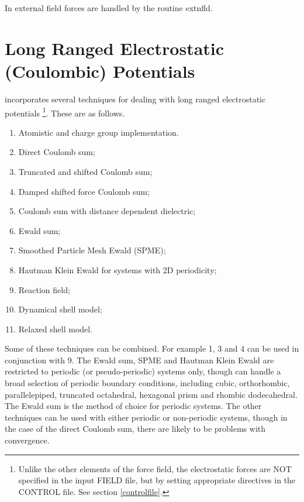 In \D{} external field forces are handled by the routine {\sc extnfld}.

\section{Long Ranged Electrostatic (Coulombic) Potentials}
\label{coulomb}

\D{} incorporates several techniques for dealing with long
ranged electrostatic potentials
\footnote{Unlike the other elements of the force field, the electrostatic 
forces are NOT specified in the input FIELD file, but by setting 
appropriate directives in the CONTROL  file. See section 
\ref{controlfile}.}. These are as follows. 
\begin{enumerate}
\item Atomistic and charge group implementation.
\item Direct Coulomb sum;
\item Truncated and shifted Coulomb sum;
\item Damped shifted force Coulomb sum;
\item Coulomb sum with distance dependent dielectric;
\item Ewald sum;
\item Smoothed Particle Mesh Ewald (SPME);
\item Hautman Klein Ewald for systems with 2D periodicity;
\item Reaction field;
\item Dynamical shell model;
\item Relaxed shell model.
\end{enumerate}
Some of these techniques can be combined. For example 1, 3 and 4 can
be used in conjunction with 9. The Ewald sum,
SPME and Hautman Klein
Ewald
are restricted to periodic (or pseudo-periodic) systems only, though \D{}
can handle a broad selection of periodic boundary
conditions, including cubic, orthorhombic,
parallelepiped, truncated octahedral, hexagonal prism and rhombic
dodecahedral. The Ewald sum is the method of
choice for periodic systems. The other techniques can be used with
either periodic or non-periodic systems, though in the case of the
direct Coulomb sum, there are likely to be
problems with convergence.

